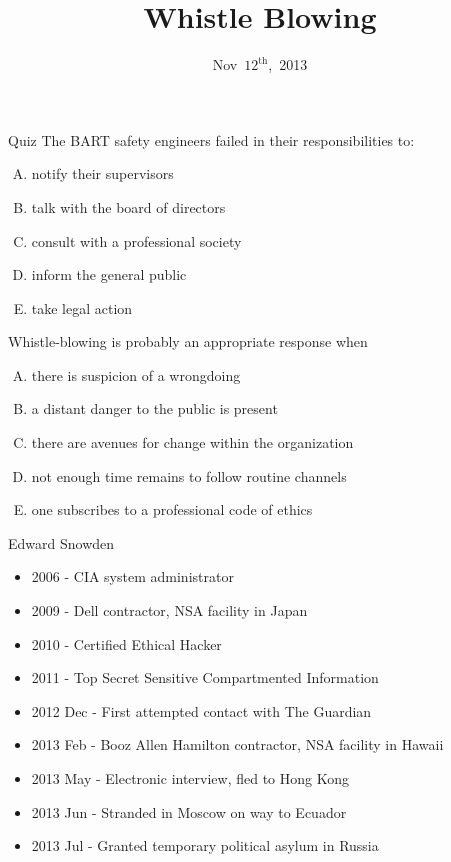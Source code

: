 \documentclass{beamer}
\title{Whistle Blowing}
\date{Nov~$12^{\text{th}}$,~2013}
\begin{document}
\begin{frame}
\titlepage
\end{frame}

\begin{frame}{Quiz}
The BART safety engineers failed in their responsibilities to:
\begin{enumerate}[(A)]
\item<1> notify their supervisors
\item<1> talk with the board of directors
\item<1> consult with a professional society
\item<1-2> inform the general public %
\item<1> take legal action
\end{enumerate}
\bigskip
Whistle-blowing is probably an appropriate response when
\begin{enumerate}[(A)]
\item<1> there is suspicion of a wrongdoing
\item<1> a distant danger to the public is present
\item<1> there are avenues for change within the organization
\item<1-2> not enough time remains to follow routine channels
\item<1> one subscribes to a professional code of ethics
\end{enumerate}
\end{frame}

\begin{frame}{Edward Snowden}
\begin{itemize}
\item 2006 - CIA system administrator
\item 2009 - Dell contractor, NSA facility in Japan
\item 2010 - Certified Ethical Hacker
\item 2011 - Top Secret Sensitive Compartmented Information
\item 2012 Dec - First attempted contact with The Guardian
\item 2013 Feb - Booz Allen Hamilton contractor, NSA facility in Hawaii
\item 2013 May - Electronic interview, fled to Hong Kong
\item 2013 Jun - Stranded in Moscow on way to Ecuador
\item 2013 Jul - Granted temporary political asylum in Russia
\end{itemize}
\end{frame}
\end{document}

